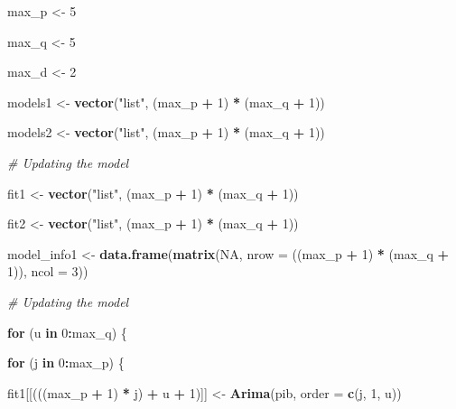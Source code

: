\documentclass[11pt, a4paper]{report}
\newenvironment{Shaded}{\begin{snugshade}}{\end{snugshade}}
\newcommand{\CommentTok}[1]{\textcolor[rgb]{0.56,0.35,0.01}{\textit{#1}}}
\newcommand{\ControlFlowTok}[1]{\textcolor[rgb]{0.13,0.29,0.53}{\textbf{#1}}}
\newcommand{\DataTypeTok}[1]{\textcolor[rgb]{0.13,0.29,0.53}{#1}}
\newcommand{\DecValTok}[1]{\textcolor[rgb]{0.00,0.00,0.81}{#1}}
\newcommand{\KeywordTok}[1]{\textcolor[rgb]{0.13,0.29,0.53}{\textbf{#1}}}
\newcommand{\NormalTok}[1]{#1}
\newcommand{\OperatorTok}[1]{\textcolor[rgb]{0.81,0.36,0.00}{\textbf{#1}}}
\newcommand{\OtherTok}[1]{\textcolor[rgb]{0.56,0.35,0.01}{#1}}
\newcommand{\StringTok}[1]{\textcolor[rgb]{0.31,0.60,0.02}{#1}}
\theoremstyle{plain}
\theoremstyle{plain}
\theoremstyle{remark}
\begin{document}
\begin{Shaded}
\begin{Highlighting}[]
\NormalTok{max_p <-}\StringTok{ }\DecValTok{5}

\NormalTok{max_q <-}\StringTok{ }\DecValTok{5}

\NormalTok{max_d <-}\StringTok{ }\DecValTok{2}

\NormalTok{models1 <-}\StringTok{ }\KeywordTok{vector}\NormalTok{(}\StringTok{"list"}\NormalTok{, (max_p }\OperatorTok{+}\StringTok{ }\DecValTok{1}\NormalTok{) }\OperatorTok{*}\StringTok{ }\NormalTok{(max_q }\OperatorTok{+}\StringTok{ }\DecValTok{1}\NormalTok{))}

\NormalTok{models2 <-}\StringTok{ }\KeywordTok{vector}\NormalTok{(}\StringTok{"list"}\NormalTok{, (max_p }\OperatorTok{+}\StringTok{ }\DecValTok{1}\NormalTok{) }\OperatorTok{*}\StringTok{ }\NormalTok{(max_q }\OperatorTok{+}\StringTok{ }\DecValTok{1}\NormalTok{))}

\CommentTok{# Updating the model}

\NormalTok{fit1 <-}\StringTok{ }\KeywordTok{vector}\NormalTok{(}\StringTok{"list"}\NormalTok{, (max_p }\OperatorTok{+}\StringTok{ }\DecValTok{1}\NormalTok{) }\OperatorTok{*}\StringTok{ }\NormalTok{(max_q }\OperatorTok{+}\StringTok{ }\DecValTok{1}\NormalTok{))}

\NormalTok{fit2 <-}\StringTok{ }\KeywordTok{vector}\NormalTok{(}\StringTok{"list"}\NormalTok{, (max_p }\OperatorTok{+}\StringTok{ }\DecValTok{1}\NormalTok{) }\OperatorTok{*}\StringTok{ }\NormalTok{(max_q }\OperatorTok{+}\StringTok{ }\DecValTok{1}\NormalTok{))}

\NormalTok{model_info1 <-}\StringTok{ }\KeywordTok{data.frame}\NormalTok{(}\KeywordTok{matrix}\NormalTok{(}\OtherTok{NA}\NormalTok{, }\DataTypeTok{nrow =}\NormalTok{ ((max_p }\OperatorTok{+}\StringTok{ }\DecValTok{1}\NormalTok{) }\OperatorTok{*}\StringTok{ }\NormalTok{(max_q }\OperatorTok{+}\StringTok{ }
\StringTok{    }\DecValTok{1}\NormalTok{)), }\DataTypeTok{ncol =} \DecValTok{3}\NormalTok{))}




\CommentTok{# Updating the model}

\ControlFlowTok{for}\NormalTok{ (u }\ControlFlowTok{in} \DecValTok{0}\OperatorTok{:}\NormalTok{max_q) \{}
    
    \ControlFlowTok{for}\NormalTok{ (j }\ControlFlowTok{in} \DecValTok{0}\OperatorTok{:}\NormalTok{max_p) \{}
        
        
\NormalTok{        fit1[[(((max_p }\OperatorTok{+}\StringTok{ }\DecValTok{1}\NormalTok{) }\OperatorTok{*}\StringTok{ }\NormalTok{j) }\OperatorTok{+}\StringTok{ }\NormalTok{u }\OperatorTok{+}\StringTok{ }\DecValTok{1}\NormalTok{)]] <-}\StringTok{ }\KeywordTok{Arima}\NormalTok{(pib, }\DataTypeTok{order =} \KeywordTok{c}\NormalTok{(j, }
            \DecValTok{1}\NormalTok{, u))}
        

\end{Highlighting}
\end{Shaded}
\end{document}
